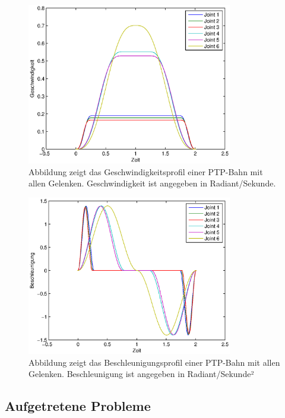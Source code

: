 \begin{figure}[H]
  \centering
    \includegraphics[width=0.8\textwidth]{pic/velocity_profile.eps}
      \caption[Geschwindigkeitsprofil einer PTP-Bahn in Matlab gepplotet]{Abbildung zeigt das Geschwindigkeitsprofil einer PTP-Bahn mit allen Gelenken. Geschwindigkeit ist angegeben in Radiant/Sekunde.}
      \label{fig:velocity_ptp_profile}
\end{figure}

\begin{figure}[H]
  \centering
    \includegraphics[width=0.8\textwidth]{pic/acceleration_profile.eps}
      \caption[Beschleunigungsprofil einer PTP-Bahn in Matlab geplottet]{Abbildung zeigt das Beschleunigungsprofil einer PTP-Bahn mit allen Gelenken. Beschleunigung ist angegeben in Radiant/Sekunde²}
      \label{fig:acceleration_ptp_profile}
\end{figure}

\subsection{Aufgetretene Probleme}
\label{sub:capi-problems_rel}

